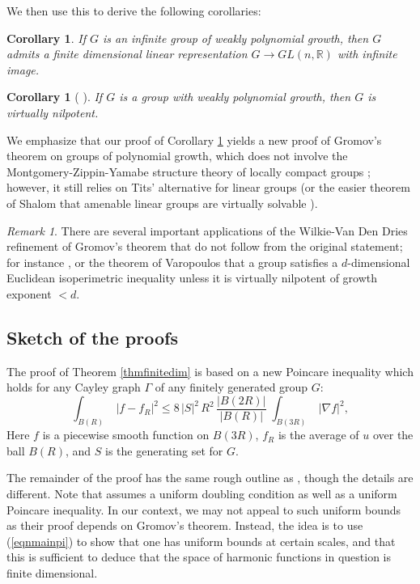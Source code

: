 \documentclass[12pt]{amsart}
\numberwithin{equation}{section}
\theoremstyle{plain}
\newtheorem{corollary}[equation]{Corollary}
\theoremstyle{remark}
\newtheorem{remark}[equation]{Remark}
\theoremstyle{definition}
\newcommand{\ra}{\rightarrow}
\newcommand{\R}{\mathbb R}
\def\Ga{\Gamma}
\def\ra{\rightarrow}
\begin{document}
We then use this to derive the following corollaries:
\begin{corollary}
\label{corinfiniterep}
If $G$ is an infinite group of weakly polynomial growth, then 
$G$ admits a finite dimensional linear representation $G\ra GL(n,\R)$
with  infinite image.
\end{corollary}

\begin{corollary}[ \cite{polygrowth,wilkie}]
\label{corgromov}
If $G$ is a  group with weakly polynomial growth, then $G$
is virtually nilpotent.
\end{corollary}

We emphasize that our proof
of Corollary \ref{corgromov} yields a new proof of Gromov's theorem on 
groups of polynomial growth,  which does not involve the 
Montgomery-Zippin-Yamabe structure theory of locally compact 
groups  \cite{montgomeryzippin}; however, it still relies
on Tits' alternative for linear groups \cite{tits}
(or the easier theorem of Shalom that amenable linear
groups are virtually solvable \cite{shalom}).  

\begin{remark}
There are several important
applications of the Wilkie-Van Den Dries refinement
\cite{wilkie} of Gromov's theorem \cite{polygrowth} that do not 
follow from the original statement; for instance 
\cite{panos}, or the theorem of Varopoulos that a group
satisfies a $d$-dimensional Euclidean isoperimetric
inequality unless it is virtually nilpotent of growth 
exponent $<d$. 
\end{remark}


\subsection{Sketch of the proofs}
The proof of Theorem \ref{thmfinitedim} 
is based on a new Poincare inequality which holds for any Cayley
graph $\Ga$ of any finitely generated group $G$:  
\begin{equation}
\label{eqnmainpi}
\int_{B(R)}\;|f-f_R|^2
\leq 8\,|S|^2\,R^2\,\frac{|B(2R)|}{|B(R)|}\;
\int_{B(3R)}\;|\nabla f|^2,
\end{equation}
Here  $f$ is a piecewise smooth function on $B(3R)$,
 $f_R$ is the average of $u$ over the ball $B(R)$,
and $S$ is the generating set for $G$. 


The remainder of the proof
has the same rough outline as \cite{coldingminicozzi},
though the details are different.
Note that \cite{coldingminicozzi} assumes a uniform doubling
condition as well as a uniform Poincare inequality.
In our context, we may not appeal to such uniform bounds
as their proof depends on Gromov's theorem.  Instead, the
idea is to use (\ref{eqnmainpi}) to show that one has uniform 
bounds at certain scales, and that this is sufficient
to deduce that the space of harmonic functions in 
question is finite dimensional.
\end{document}
